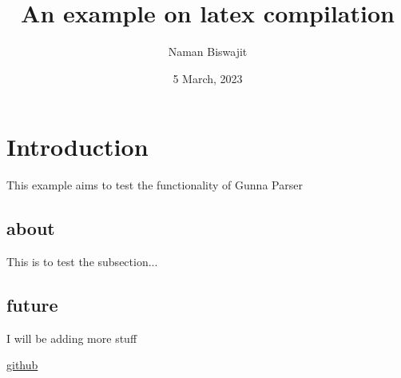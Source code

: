 \documentclass{article}
\title{An example on latex compilation}
\author{Naman Biswajit}
\date{5 March, 2023}
\begin{document}
\maketitle




\section{Introduction }
This example aims to test the functionality of Gunna Parser

\subsection{about }
This is to test the subsection...

\subsection{future }
I will be adding more stuff

\href{https://github.com/}{ github}
\end{document}
